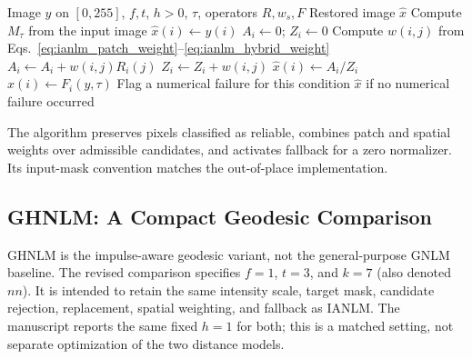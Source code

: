 \documentclass[pdflatex,iicol,sn-mathphys-num]{sn-jnl}
\newif\ifshowportuguese
\newcommand{\pt}[1]{\ifshowportuguese\par\begingroup\small\color{blue!55!black}\noindent\textbf{PT: }#1\par\endgroup\fi}
\begin{document}
\begin{algorithm}[!t]
\caption{IANLM aggregation structure with configurable tolerance}
\label{alg:ianlm}
\begin{algorithmic}[1]
\Require Image $y$ on $[0,255]$, $f,t$, $h>0$, $\tau$, operators $R,w_s,F$
\Ensure Restored image $\hat{x}$
\State Compute $M_\tau$ from the input image
        \State $\hat{x}(i)\gets y(i)$
    \Else
        \State $A_i\gets0$; $Z_i\gets0$
            \State Compute $w(i,j)$ from Eqs.~\eqref{eq:ianlm_patch_weight}--\eqref{eq:ianlm_hybrid_weight}
            \State $A_i\gets A_i+w(i,j)R_i(j)$
            \State $Z_i\gets Z_i+w(i,j)$
        \EndFor
            \State $\hat{x}(i)\gets A_i/Z_i$
            \State $\hat{x}(i)\gets F_i(y,\tau)$
        \Else
            \State Flag a numerical failure for this condition
        \EndIf
    \EndIf
\EndFor
\State \Return $\hat{x}$ if no numerical failure occurred
\end{algorithmic}
\end{algorithm}
The algorithm preserves pixels classified as reliable, combines patch and spatial weights over admissible candidates, and activates fallback for a zero normalizer. Its input-mask convention matches the out-of-place implementation.
\pt{O algoritmo preserva pixels classificados como confiáveis, combina pesos de patches e espaciais sobre candidatos admissíveis e ativa fallback para normalizador nulo. Sua convenção de máscara de entrada corresponde à implementação fora do lugar.}

\subsection{GHNLM: A Compact Geodesic Comparison}
\label{subsec:ghnlm}

GHNLM is the impulse-aware geodesic variant, not the general-purpose GNLM baseline. The revised comparison specifies $f=1$, $t=3$, and $k=7$ (also denoted $nn$). It is intended to retain the same intensity scale, target mask, candidate rejection, replacement, spatial weighting, and fallback as IANLM. The manuscript reports the same fixed $h=1$ for both; this is a matched setting, not separate optimization of the two distance models.
\pt{O GHNLM é a variante geodésica orientada a impulsos, não o baseline GNLM de propósito geral. A comparação revisada especifica $f=1$, $t=3$ e $k=7$ (também denotado $nn$). Ela deve manter a mesma escala de intensidade, máscara de alvos, rejeição de candidatos, substituição, ponderação espacial e fallback do IANLM. O manuscrito informa o mesmo $h=1$ fixo para ambos; essa é uma configuração correspondente, não uma otimização separada dos dois modelos de distância.}
\end{document}
